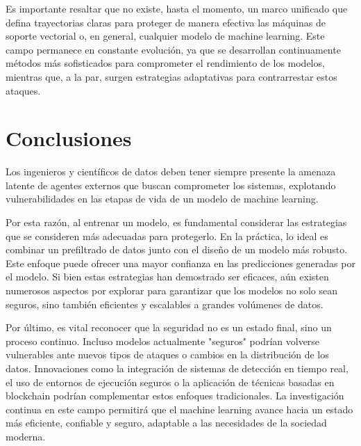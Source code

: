 \documentclass[letterpaper,12pt,oneside]{book}
\begin{document}
{{{{Es importante resaltar que no existe, hasta el momento, un marco unificado que defina trayectorias claras para proteger de manera efectiva las máquinas de soporte vectorial o, en general, cualquier modelo de machine learning. Este campo permanece en constante evolución, ya que se desarrollan continuamente métodos más sofisticados para comprometer el rendimiento de los modelos, mientras que, a la par, surgen estrategias adaptativas para contrarrestar estos ataques.



\section{Conclusiones}
Los ingenieros y científicos de datos deben tener siempre presente la amenaza latente de agentes externos que buscan comprometer los sistemas, explotando vulnerabilidades en las etapas de vida de un modelo de machine learning.

Por esta razón, al entrenar un modelo, es fundamental considerar las estrategias que se consideren más adecuadas para protegerlo. En la práctica, lo ideal es combinar un prefiltrado de datos junto con el diseño de un modelo más robusto. Este enfoque puede ofrecer una mayor confianza en las predicciones generadas por el modelo. Si bien estas estrategias han demostrado ser eficaces, aún existen numerosos aspectos por explorar para garantizar que los modelos no solo sean seguros, sino también eficientes y escalables a grandes volúmenes de datos.

Por último, es vital reconocer que la seguridad no es un estado final, sino un proceso continuo. Incluso modelos actualmente "seguros" podrían volverse vulnerables ante nuevos tipos de ataques o cambios en la distribución de los datos. Innovaciones como la integración de sistemas de detección en tiempo real, el uso de entornos de ejecución seguros o la aplicación de técnicas basadas en blockchain podrían complementar estos enfoques tradicionales. La investigación continua en este campo permitirá que el machine learning avance hacia un estado más eficiente, confiable y seguro, adaptable a las necesidades de la sociedad moderna.




















}}}}
\end{document}
